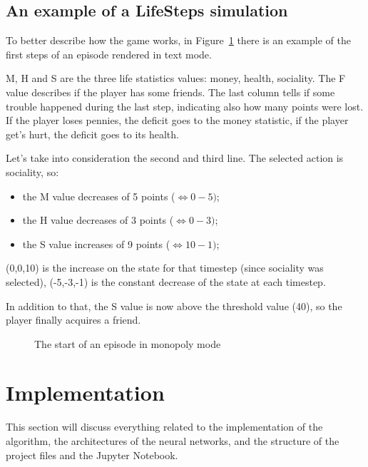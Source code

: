 \documentclass{article}
\begin{document}
\subsection{An example of a LifeSteps simulation}

To better describe how the game works, in Figure~\ref{fig:A} there is an example of the first steps of an episode rendered in text mode.

M, H and S are the three life statistics values: money, health, sociality. The F value describes if the player has some friends. The last column tells if some trouble happened during the last step, indicating also how many points were lost. If the player loses pennies, the deficit goes to the money statistic, if the player get's hurt, the deficit goes to its health.

Let's take into consideration the second and third line. The selected action is sociality, so:
\begin{itemize}
    \item the M value decreases of 5 points (\(\Leftrightarrow 0-5)\);
    \item the H value decreases of 3 points (\(\Leftrightarrow 0-3)\);
    \item the S value increases of 9 points (\(\Leftrightarrow 10-1)\);
\end{itemize}
(0,0,10) is the increase on the state for that timestep (since sociality was selected), (-5,-3,-1) is the constant decrease of the state at each timestep.

In addition to that, the S value is now above the threshold value (40), so the player finally acquires a friend.

\begin{figure}
  \centering
  \caption{The start of an episode in monopoly mode}
  \label{fig:A}
\end{figure}

\section{Implementation}
This section will discuss everything related to the implementation of the algorithm, the architectures of the neural networks, and the structure of the project files and the Jupyter Notebook.
\end{document}
